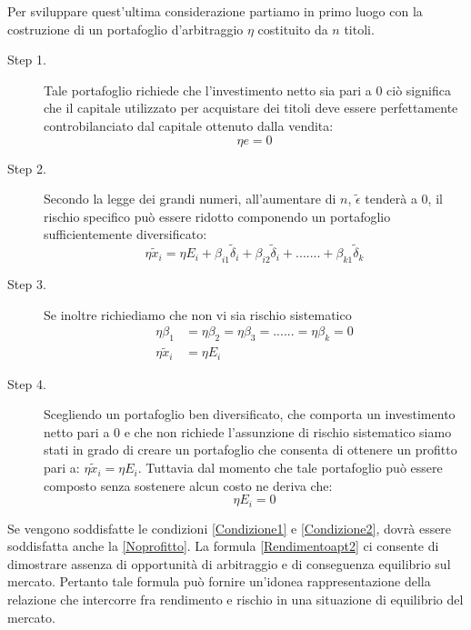 Per sviluppare quest'ultima considerazione partiamo in primo luogo con la costruzione di un portafoglio d'arbitraggio $\eta$ costituito da $n$ titoli. 
\begin{description}
	\item[Step 1.] Tale portafoglio richiede che l'investimento netto sia pari a 0 ciò significa che il capitale utilizzato per acquistare dei titoli deve essere perfettamente controbilanciato dal capitale ottenuto dalla vendita:
	\begin{equation}
	\label{Condizione1}
	\eta e=0
	\end{equation}
	\item[Step 2.]Secondo la legge dei grandi numeri, all'aumentare di $n$, $\tilde{\epsilon}$ tenderà a 0, il rischio specifico può essere ridotto componendo un portafoglio sufficientemente diversificato:
	\begin{equation}
	\eta\tilde{x}_i = \eta E_i+\beta_{i1}\tilde{\delta}_i+\beta_{i2}\tilde{\delta}_i+ .......+ \beta_{k1}\tilde{\delta}_k
	\end{equation}
	\item[Step 3.] Se inoltre richiediamo che non vi sia rischio sistematico 
		\begin{equation}
		\label{Condizione2}
		\begin{split}
		\eta\beta_1 &=	\eta\beta_2 = \eta\beta_3 = ......= 	\eta\beta_k= 0 \\
	\eta\tilde{x}_i&=\eta E_i
		\end{split}
	\end{equation}
	\item [Step 4.] Scegliendo un portafoglio ben diversificato, che comporta un investimento netto pari a 0 e che non richiede l'assunzione di rischio sistematico siamo stati in grado di creare un portafoglio che consenta di ottenere un profitto pari a: $\eta\tilde{x}_i=\eta E_i$. Tuttavia dal momento che tale portafoglio può essere composto senza sostenere alcun costo ne deriva che:
	\begin{equation}
	\label{Noprofitto}
	\eta E_i=0
	\end{equation} 
\end{description}
Se vengono soddisfatte le condizioni \ref{Condizione1} e \ref{Condizione2}, dovrà essere soddisfatta  anche la \ref{Noprofitto}. La formula \ref{Rendimentoapt2} ci consente di dimostrare assenza di opportunità di arbitraggio e di conseguenza equilibrio sul mercato. Pertanto tale formula può fornire un'idonea rappresentazione della relazione che intercorre fra rendimento e rischio in una situazione di equilibrio del mercato. 
 
